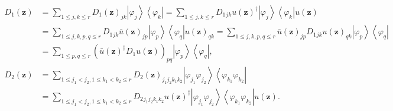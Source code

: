 \documentclass[aps,preprint]{revtex4}%
\begin{document}
\begin{align}
D_{1}\left(  \mathbf{z}\right)   &  =\sum_{1\leq j,k\leq r}D_{1}\left(
\mathbf{z}\right)  _{jk}\left\vert \varphi_{j}\right\rangle \left\langle
\varphi_{k}\right\vert =\sum_{1\leq j,k\leq r}D_{1}{}_{jk}u\left(
\mathbf{z}\right)  ^{\dagger}\left\vert \varphi_{j}\right\rangle \left\langle
\varphi_{k}\right\vert u\left(  \mathbf{z}\right)  \nonumber\\
&  =\sum_{1\leq j,k,p,q\leq r}D_{1}{}_{jk}\bar{u}\left(  \mathbf{z}\right)
_{jp}\left\vert \varphi_{p}\right\rangle \left\langle \varphi_{q}\right\vert
u\left(  \mathbf{z}\right)  _{qk}=\sum_{1\leq j,k,p,q\leq r}\bar{u}\left(
\mathbf{z}\right)  _{jp}D_{1}{}_{jk}u\left(  \mathbf{z}\right)  _{qk}%
\left\vert \varphi_{p}\right\rangle \left\langle \varphi_{q}\right\vert
\nonumber\\
&  =\sum_{1\leq p,q\leq r}\left(  \bar{u}\left(  \mathbf{z}\right)  ^{\dagger
}D_{1}{}u\left(  \mathbf{z}\right)  \right)  _{pq}\left\vert \varphi
_{p}\right\rangle \left\langle \varphi_{q}\right\vert ,\nonumber\\
D_{2}\left(  \mathbf{z}\right)   &  =\sum_{1\leq j_{1}<j_{2},1\leq k_{1}%
<k_{2}\leq r}D_{2}\left(  \mathbf{z}\right)  _{j_{1}j_{2}k_{1}k_{2}}\left\vert
\varphi_{j_{1}}\varphi_{j_{2}}\right\rangle \left\langle \varphi_{k_{1}%
}\varphi_{k_{2}}\right\vert \nonumber\\
&  =\sum_{1\leq j_{1}<j_{2},1\leq k_{1}<k_{2}\leq r}D_{2}{}_{j_{1}j_{2}%
k_{1}k_{2}}u\left(  \mathbf{z}\right)  ^{\dagger}\left\vert \varphi_{j_{1}%
}\varphi_{j_{2}}\right\rangle \left\langle \varphi_{k_{1}}\varphi_{k_{2}%
}\right\vert u\left(  \mathbf{z}\right)  .
\end{align}
\end{document}
